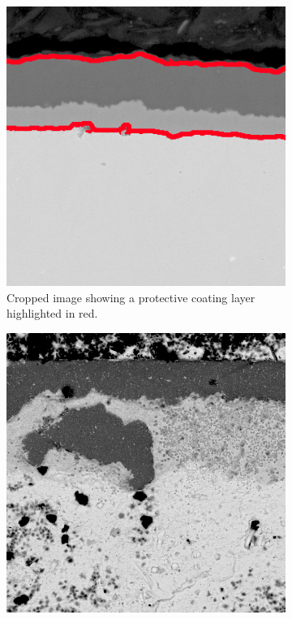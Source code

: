 \begin{figure}[H]
    \centering
    \begin{subfigure}{0.4\textwidth}
        \centering
        \includegraphics[width=\linewidth]{PICTURES/intro/177_CROP.png}
        \caption{Cropped image showing a protective coating layer highlighted in red.}         
        \label{fig:coating}
    \end{subfigure}
    \hfill
    \begin{subfigure}{0.4\textwidth}
        \centering
        \includegraphics[width=\linewidth]{PICTURES/intro/625_3500h_low_cross_strana1_13_crop.png}

\end{subfigure}
\end{figure}
